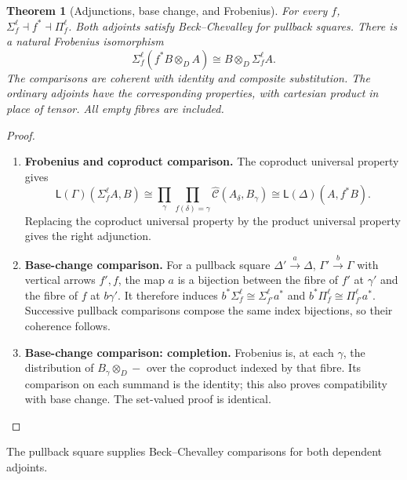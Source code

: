 \documentclass[11pt,a4paper]{article}
\numberwithin{equation}{section}
\newtheorem{theorem}{Theorem}[section]
\theoremstyle{definition}
\theoremstyle{remark}
\theoremstyle{plain}
\begin{document}
\begin{theorem}[Adjunctions, base change, and Frobenius]
\label{thm:egt-linear-dependent-adjoints}
For every $f$,
$\Sigma_f^\ell\dashv f^*\dashv\Pi_f^\ell$.
Both adjoints satisfy Beck--Chevalley for pullback squares. There is a
natural Frobenius isomorphism
\[
 \Sigma_f^\ell(f^*B\otimes_D A)
       \cong B\otimes_D\Sigma_f^\ell A.
\]
The comparisons are coherent with identity and composite substitution.
The ordinary adjoints have the corresponding properties, with cartesian
product in place of tensor. All empty fibres are included.
\end{theorem}
\begin{proof}
\leavevmode
\begin{enumerate}[label=\textup{(\arabic*)},leftmargin=*,itemsep=4pt,topsep=3pt]
  \item \textbf{Frobenius and coproduct comparison.} The coproduct universal property gives
\[
 \mathsf L(\Gamma)(\Sigma_f^\ell A,B)
 \cong\prod_\gamma\prod_{f(\delta)=\gamma}
             \widehat{\mathcal C}(A_\delta,B_\gamma)
 \cong\mathsf L(\Delta)(A,f^*B).
\]
Replacing the coproduct universal property by the product universal
property gives the right adjunction.
  \item \textbf{Base-change comparison.} For a pullback square
$\Delta'\xrightarrow{a}\Delta$, $\Gamma'\xrightarrow{b}\Gamma$
with vertical arrows $f',f$, the map $a$ is a bijection between the
fibre of $f'$ at $\gamma'$ and the fibre of $f$ at $b\gamma'$. It therefore induces
$b^*\Sigma_f^\ell\cong\Sigma_{f'}^\ell a^*$ and
$b^*\Pi_f^\ell\cong\Pi_{f'}^\ell a^*$. Successive pullback comparisons compose the same index bijections, so
their coherence follows.
  \item \textbf{Base-change comparison: completion.} Frobenius is, at each $\gamma$, the
distribution of $B_\gamma\otimes_D-$ over the coproduct indexed by that
fibre. Its comparison on each summand is the identity; this also proves
compatibility with base change. The set-valued proof is identical.
\end{enumerate}
\end{proof}

\noindent The pullback square supplies Beck--Chevalley comparisons for both dependent adjoints.
\begin{center}
\end{center}
\end{document}
